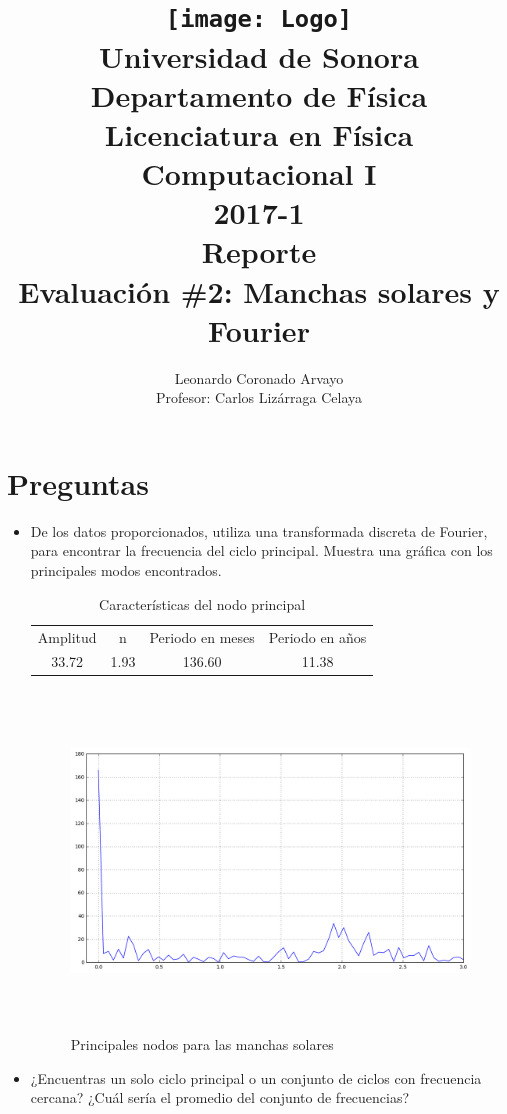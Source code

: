 \documentclass[12pt,letterpaper]{article}
\author{
Leonardo Coronado Arvayo\\
Profesor: Carlos Lizárraga Celaya   \vspace*{1.25in}}
\title{	\texttt{[image: Logo]} \\
Universidad de Sonora \\
{\small Departamento de Física \\
Licenciatura en Física \\
Computacional I \\
2017-1 \\
\vspace{0.55in} Reporte}\\ 
{\Huge Evaluación \#2: Manchas solares y Fourier}\\
\vspace*{1.0in}}
\begin{document}
	\maketitle
\newpage


\section{Preguntas}

\begin{itemize}

\item De los datos proporcionados, utiliza una transformada discreta de Fourier, para encontrar la frecuencia del ciclo principal. Muestra una gráfica con los principales modos encontrados.  

\begin{table}[H]
\centering
\begin{tabular}{|c|ccc|}

\hline
Amplitud	&	n	&	Periodo en meses & Periodo en años\\
33.72 & 1.93 & 136.60 & 11.38 \\
\hline 

\end{tabular}
\caption{Características del nodo principal}
\end{table}

 \begin{figure}[H]
	\centering
	\includegraphics[height=9cm]{four}
	\caption{Principales nodos para las manchas solares}
\end{figure}

\item ¿Encuentras un solo ciclo principal o un conjunto de ciclos con frecuencia cercana? ¿Cuál sería el promedio del conjunto de frecuencias?


\end{itemize}
\end{document}
